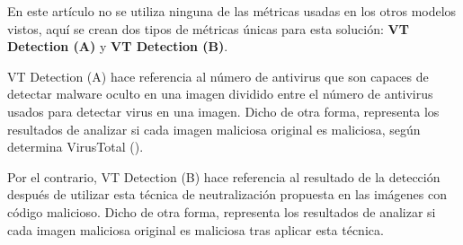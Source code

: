 En este artículo no se utiliza ninguna de las métricas usadas en los otros modelos vistos, aquí se crean dos tipos de métricas únicas para esta solución: \textbf{VT Detection (A)} y \textbf{VT Detection (B)}.

VT Detection (A) hace referencia al número de antivirus que son capaces de detectar malware oculto en una imagen dividido entre el número de antivirus usados para detectar virus en una imagen. Dicho de otra forma, representa los resultados de analizar si cada imagen maliciosa original es maliciosa, según determina VirusTotal (\cite{virustotal}). %

Por el contrario, VT Detection (B) hace referencia al resultado de la detección después de utilizar esta técnica de neutralización propuesta en las imágenes con código malicioso. Dicho de otra forma, representa los resultados de analizar si cada imagen maliciosa original es maliciosa tras aplicar esta técnica.
